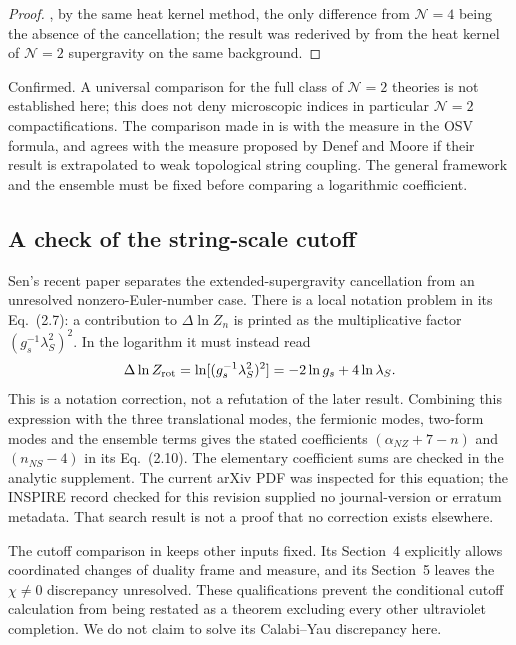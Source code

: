 \begin{proof}
\cite{Sen12N2}, by the same heat kernel method, the only difference from $\mathcal N=4$ being the absence of the cancellation; the result was rederived by \cite{KLL14} from the heat kernel of $\mathcal N=2$ supergravity on the same background.
\end{proof}

\begin{verdict}[claim 29]
Confirmed. A universal comparison for the full class of $\mathcal N=2$ theories is not established here; this does not deny microscopic indices in particular $\mathcal N=2$ compactifications. The comparison made in \cite{Sen12N2} is with the measure in the OSV formula, and agrees with the measure proposed by Denef and Moore if their result is extrapolated to weak topological string coupling. 
 The general framework and the ensemble must be fixed before comparing a logarithmic coefficient.
\end{verdict}

\subsection{A check of the string-scale cutoff}

Sen's recent paper \cite{Sen26cutoff} separates the extended-supergravity cancellation from an unresolved nonzero-Euler-number case. There is a local notation problem in its Eq.~(2.7): a contribution to $\Delta\ln Z_n$ is printed as the multiplicative factor $(g_s^{-1}\lambda_S^2)^2$. In the logarithm it must instead read
\begin{equation}
\Delta\ln Z_{\rm rot}=\ln[(g_s^{-1}\lambda_S^2)^2]
=-2\ln g_s+4\ln\lambda_S.
\end{equation}
This is a notation correction, not a refutation of the later result. Combining this expression with the three translational modes, the fermionic modes, two-form modes and the ensemble terms gives the stated coefficients $(\alpha_{NZ}+7-n)$ and $(n_{NS}-4)$ in its Eq.~(2.10). The elementary coefficient sums are checked in the analytic supplement. The current arXiv PDF was inspected for this equation; the INSPIRE record checked for this revision supplied no journal-version or erratum metadata. That search result is not a proof that no correction exists elsewhere.

The cutoff comparison in \cite{Sen26cutoff} keeps other inputs fixed. Its Section~4 explicitly allows coordinated changes of duality frame and measure, and its Section~5 leaves the $\chi\ne0$ discrepancy unresolved. These qualifications prevent the conditional cutoff calculation from being restated as a theorem excluding every other ultraviolet completion. We do not claim to solve its Calabi--Yau discrepancy here.
